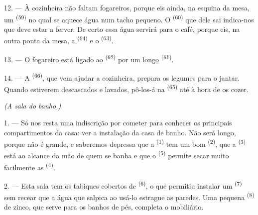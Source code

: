 12. --- À cozinheira não faltam fogareiros, porque eis ainda, na esquina
da mesa, um  \textsuperscript{(59)} no qual se aquece água
num tacho pequeno. O  \textsuperscript{(60)} que dele sai indica-nos
que deve estar a ferver. De certo essa água servirá para o café, porque
eis, na outra ponta da mesa, a  \textsuperscript{(64)} e o
 \textsuperscript{(63)}.

13. --- O fogareiro está ligado ao  \textsuperscript{(62)} por
um longo  \textsuperscript{(61)}.

14. --- A  \textsuperscript{(66)}, que vem ajudar a
cozinheira, prepara os legumes para o jantar. Quando estiverem
descascados e lavados, pô-los-á na  \textsuperscript{(65)} até à
hora de os cozer.

\VUsaut{4.0mm}
{\centering\fontsize{10.2pt}{10.2pt}\selectfont{} \textit{(A sala do banho.)}\par}
\VUsaut{3.0mm}

1. --- Só nos resta uma indiscrição por cometer para conhecer os
principais compartimentos da casa: ver a instalação da casa de banho.
Não será longo, porque não é grande, e saberemos depressa que a
 \textsuperscript{(1)} tem um bom 
\textsuperscript{(2)}, que a  \textsuperscript{(3)} está ao alcance
da mão de quem se banha e que o  \textsuperscript{(5)} permite
secar muito facilmente as  \textsuperscript{(4)}.

2. --- Esta sala tem os tabiques cobertos de 
\textsuperscript{(6)}, o que permitiu instalar um 
\textsuperscript{(7)} sem recear que a água que salpica ao usá-lo estrague as
paredes. Uma pequena  \textsuperscript{(8)} de zinco, que serve para
os banhos de pés, completa o mobiliário.
\VUsaut{6.0mm}
\VUfilet{22mm}
